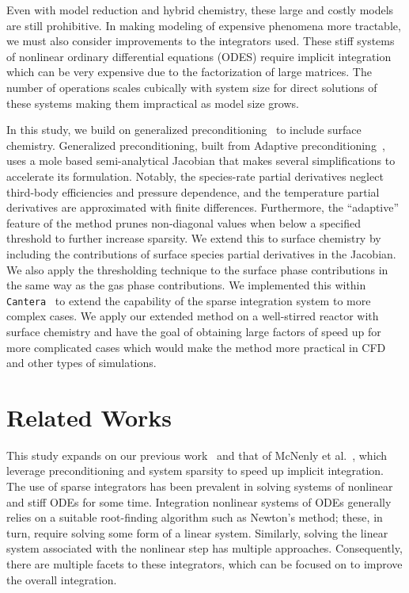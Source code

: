 \documentclass[12pt]{ussci}
\def\cantera{\texttt{Cantera}}
\def\cantera{\texttt{Cantera}}
\begin{document}
Even with model reduction and hybrid chemistry, these large and costly models are still prohibitive.
In making modeling of expensive phenomena more tractable, we must also consider improvements to the integrators used.
These stiff systems of nonlinear ordinary differential equations (ODES) require implicit integration which can be very expensive due to the factorization of large matrices.
The number of operations scales cubically with system size for direct solutions of these systems making them impractical as model size grows.

In this study, we build on generalized preconditioning~\cite{walker2022generalized} to include surface chemistry.
Generalized preconditioning, built from Adaptive preconditioning~\cite{mcnenly_faster_2015}, uses a mole based semi-analytical Jacobian that makes several simplifications to accelerate its formulation.
Notably, the species-rate partial derivatives neglect third-body efficiencies and pressure dependence, and the temperature partial derivatives are approximated with finite differences.
Furthermore, the ``adaptive'' feature of the method prunes non-diagonal values when below a specified threshold to further increase sparsity.
We extend this to surface chemistry by including the contributions of surface species partial derivatives in the Jacobian.
We also apply the thresholding technique to the surface phase contributions in the same way as the gas phase contributions.
We implemented this within \cantera{}~\cite{cantera} to extend the capability of the sparse integration system to more complex cases.
We apply our extended method on a well-stirred reactor with surface chemistry and have the goal of obtaining large factors of speed up for more complicated cases which would make the method more practical in CFD and other types of simulations.


\section{Related Works}

This study expands on our previous work~\cite{walker2022generalized} and that of McNenly et al.~\cite{mcnenly_faster_2015}, which leverage preconditioning and system sparsity to speed up implicit integration.
The use of sparse integrators has been prevalent in solving systems of nonlinear and stiff ODEs for some time.
Integration nonlinear systems of ODEs generally relies on a suitable root-finding algorithm such as Newton's method; these, in turn, require solving some form of a linear system.
Similarly, solving the linear system associated with the nonlinear step has multiple approaches.
Consequently, there are multiple facets to these integrators, which can be focused on to improve the overall integration.
\end{document}
